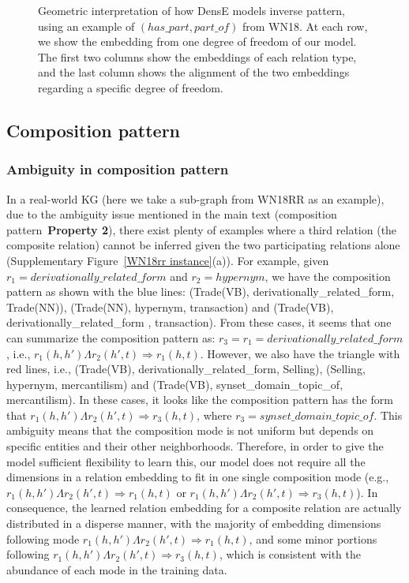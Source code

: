 \documentclass[11pt]{article}
\begin{document}
\begin{figure*}[htbp]
\caption{Geometric interpretation of how DensE models inverse pattern, using an example of \((has\_part, part\_of)\) from WN18. At each row, we show the embedding from one degree of freedom of our model. The first two columns show the embeddings of each relation type, and the last column shows the alignment of the two embeddings regarding a specific degree of freedom. }
\label{inverse plots1}
\end{figure*}











\subsection{Composition pattern}

\subsubsection{Ambiguity in composition pattern}

In a real-world KG (here we take a sub-graph from WN18RR as an example), due to the ambiguity issue mentioned in the main text (composition pattern~\textbf{Property 2}), there exist plenty of examples where a third relation (the composite relation) cannot be inferred given the two participating relations alone (Supplementary Figure~\ref{WN18rr instance}(a)). For example, given \(r_1 = derivationally\_{related}\_{form}\) and \( r_2 = hypernym\), we have the composition pattern as shown with the blue lines: (Trade(VB), derivationally\_{related}\_{form}, Trade(NN)), (Trade(NN), hypernym, transaction) and (Trade(VB), derivationally\_{related}\_{form} , transaction). From these cases, it seems that one can summarize the composition pattern as: \(r_3 = r_1 = derivationally\_{related}\_{form}\), i.e., \(r_1(h, h') \Lambda r_2(h', t) \Rightarrow r_1(h, t) \). However, we also have the triangle with red lines, i.e., (Trade(VB), derivationally\_{related}\_{form}, Selling), (Selling, hypernym, mercantilism) and (Trade(VB), synset\_domain\_topic\_of, mercantilism). In these cases, it looks like the composition pattern has the form that \(r_1(h, h') \Lambda r_2(h', t) \Rightarrow r_3(h, t) \), where \(r_3 = synset\_domain\_topic\_of\). This ambiguity means that the composition mode is not uniform but depends on specific entities and their other neighborhoods. Therefore, in order to give the model sufficient flexibility to learn this, our model does not require all the dimensions in a relation embedding to fit in one single composition mode (e.g., \(r_1(h, h') \Lambda r_2(h', t) \Rightarrow r_1(h, t) \) or \(r_1(h, h') \Lambda r_2(h', t) \Rightarrow r_3(h, t) \)). In consequence, the learned relation embedding for a composite relation are actually distributed in a disperse manner, with the majority of embedding dimensions following mode \(r_1(h, h') \Lambda r_2(h', t) \Rightarrow r_1(h, t) \), and some minor portions following \(r_1(h, h') \Lambda r_2(h', t) \Rightarrow r_3(h, t) \), which is consistent with the abundance of each mode in the training data.
\end{document}
